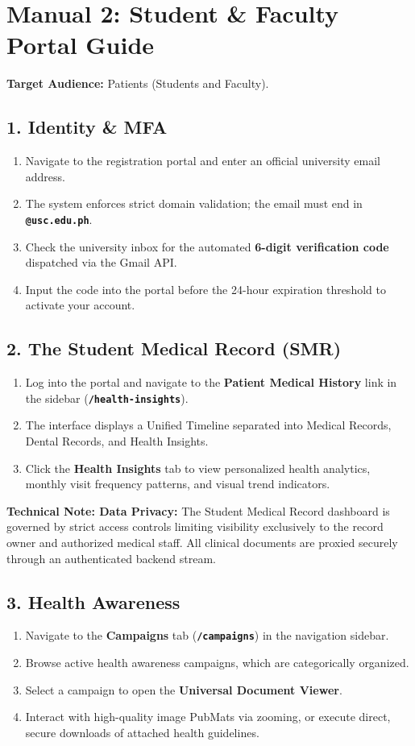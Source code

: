 \section{Manual 2: Student \& Faculty Portal Guide}

\textbf{Target Audience:} Patients (Students and Faculty).

\subsection{1. Identity \& MFA}
\begin{enumerate}
    \item Navigate to the registration portal and enter an official university email address.
    \item The system enforces strict domain validation; the email must end in \textbf{\texttt{@usc.edu.ph}}.
    \item Check the university inbox for the automated \textbf{6-digit verification code} dispatched via the Gmail API.
    \item Input the code into the portal before the 24-hour expiration threshold to activate your account.
\end{enumerate}

\subsection{2. The Student Medical Record (SMR)}
\begin{enumerate}
    \item Log into the portal and navigate to the \textbf{Patient Medical History} link in the sidebar (\textbf{\texttt{/health-insights}}).
    \item The interface displays a Unified Timeline separated into Medical Records, Dental Records, and Health Insights.
    \item Click the \textbf{Health Insights} tab to view personalized health analytics, monthly visit frequency patterns, and visual trend indicators.
\end{enumerate}
\textbf{Technical Note: Data Privacy:} The Student Medical Record dashboard is governed by strict access controls limiting visibility exclusively to the record owner and authorized medical staff. All clinical documents are proxied securely through an authenticated backend stream.

\subsection{3. Health Awareness}
\begin{enumerate}
    \item Navigate to the \textbf{Campaigns} tab (\textbf{\texttt{/campaigns}}) in the navigation sidebar.
    \item Browse active health awareness campaigns, which are categorically organized.
    \item Select a campaign to open the \textbf{Universal Document Viewer}.
    \item Interact with high-quality image PubMats via zooming, or execute direct, secure downloads of attached health guidelines.
\end{enumerate}

